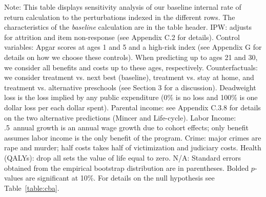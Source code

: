 \documentclass[static]{JJH-Beamer}
\begin{document}
{\flushleft \small Note: This table displays sensitivity analysis of our baseline internal rate of return calculation to the perturbations indexed in the different rows. The characteristics of the \textit{baseline} calculation are in the table header. IPW: adjusts for attrition and item non-response (see Appendix C.2 for details). Control variables: Apgar scores at ages 1 and 5 and a high-risk index (see Appendix G for details on how we choose these controls). When predicting up to ages 21 and 30, we consider all benefits and costs up to these ages, respectively. Counterfactuals: we consider treatment vs. next best (baseline), treatment vs. stay at home, and treatment vs. alternative preschools (see Section 3 for a discussion). Deadweight loss is the loss implied by any public expenditure (0\% is no loss and 100\% is one dollar loss per each dollar spent). Parental income: see Appendix C.3.8 for details on the two alternative predictions (Mincer and Life-cycle). Labor Income: .5\ annual growth is an annual wage growth due to cohort effects; only benefit assumes labor income is the only benefit of the program. Crime: major crimes are rape and murder; half costs takes half of victimization and judiciary costs. Health (QALYs): drop all sets the value of life equal to zero. N/A: Standard errors obtained from the empirical bootstrap distribution are in parentheses. Bolded $p$-values are significant at 10\%. For details on the null hypothesis see Table~\ref{table:cba}.\\}
\clearpage
\end{document}
